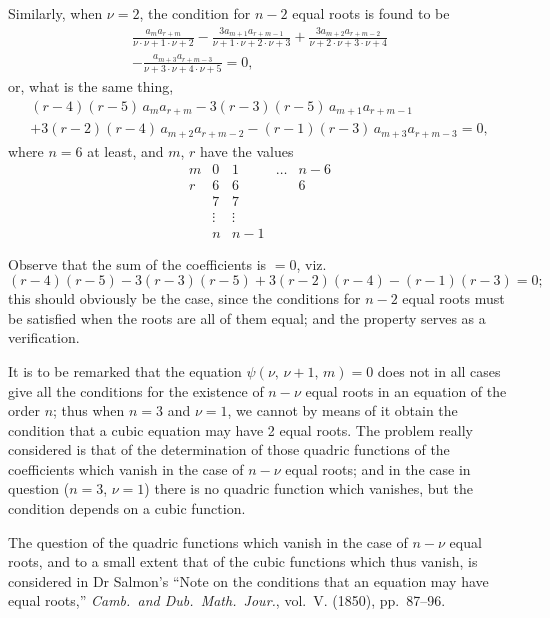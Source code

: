 \documentclass[11pt,a4paper]{book}
\begin{document}
Similarly, when $\nu=2$, the condition for $n-2$ equal roots is found to be
\begin{multline*}
\frac{a_{m}a_{r+m}}{\nu \cdot \nu+1 \cdot \nu+2} - \frac{3a_{m+1}a_{r+m-1}}{\nu+1 \cdot \nu+2 \cdot \nu+3} + \frac{3a_{m+2}a_{r+m-2}}{\nu+2 \cdot \nu+3 \cdot \nu+4} \\
- \frac{a_{m+3}a_{r+m-3}}{\nu+3 \cdot \nu+4 \cdot \nu+5} = 0,
\end{multline*}
or, what is the same thing,
\begin{multline*}
(r-4)(r-5)\,a_{m}a_{r+m} - 3(r-3)(r-5)\,a_{m+1}a_{r+m-1} \\
+ 3(r-2)(r-4)\,a_{m+2}a_{r+m-2} - (r-1)(r-3)\,a_{m+3}a_{r+m-3} = 0,
\end{multline*}
where $n=6$ at least, and $m$, $r$ have the values
\[
\begin{array}{c|cccc}
m & 0 & 1 & \dots & n-6 \\ \hline
r & 6 & 6 & & 6 \\
  & 7 & 7 & & \\
  & \vdots & \vdots & & \\
  & n & n-1 & &
\end{array}
\]

Observe that the sum of the coefficients is $=0$, viz.
\[
(r-4)(r-5) - 3(r-3)(r-5) + 3(r-2)(r-4) - (r-1)(r-3) = 0;
\]
this should obviously be the case, since the conditions for $n-2$ equal roots must be satisfied when the roots are all of them equal; and the property serves as a verification.

It is to be remarked that the equation $\psi(\nu,\, \nu+1,\, m) = 0$ does not in all cases give all the conditions for the existence of $n-\nu$ equal roots in an equation of the order $n$; thus when $n=3$ and $\nu=1$, we cannot by means of it obtain the condition that a cubic equation may have 2 equal roots. The problem really considered is that of the determination of those quadric functions of the coefficients which vanish in the case of $n-\nu$ equal roots; and in the case in question ($n=3$, $\nu=1$) there is no quadric function which vanishes, but the condition depends on a cubic function.

The question of the quadric functions which vanish in the case of $n-\nu$ equal roots, and to a small extent that of the cubic functions which thus vanish, is considered in Dr Salmon's ``Note on the conditions that an equation may have equal roots,'' \textit{Camb.\ and Dub.\ Math.\ Jour.}, vol.~V. (1850), pp.~87--96.

\newpage
\end{document}
